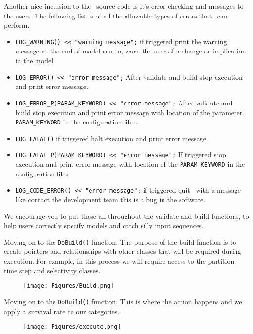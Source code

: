 Another nice inclusion to the \CNAME\ source code is it's error checking and messages to the users. The following list is of all the allowable types of errors that \CNAME\ can perform.

\begin{itemize}
	\item \texttt{LOG\_WARNING() << "warning message";} if triggered print the warning message at the end of model run to, warn the user of a change or implication in the model.
	\item \texttt{LOG\_ERROR() << "error message";} After validate and build stop execution and print error message.
	\item \texttt{LOG\_ERROR\_P(PARAM\_KEYWORD) << "error message";} After validate and build stop execution and print error message with location of the parameter \texttt{PARAM\_KEYWORD} in the configuration files.
	\item \texttt{LOG\_FATAL()} if triggered halt execution and print error message.
	\item \texttt{LOG\_FATAL\_P(PARAM\_KEYWORD) << "error message";} If triggered stop execution and print error message with location of the \texttt{PARAM\_KEYWORD} in the configuration files.		
	\item \texttt{LOG\_CODE\_ERROR() << "error message";} if triggered quit \CNAME\ with a message like contact the development team this is a bug in the software.	
\end{itemize}

We encourage you to put these all throughout the validate and build functions, to help users correctly specify models and catch silly input sequences.


Moving on to the \texttt{DoBuild()} function. The purpose of the build function is to create pointers and relationships with other classes that will be required during execution. For example, in this process we will require access to the partition, time step and selectivity classes.

\begin{figure}[!ht]
	\centering
	\texttt{[image: Figures/Build.png]}
	\caption{}\label{fig:build}
\end{figure}


Moving on to the \texttt{DoBuild()} function. This is where the action happens and we apply a survival rate to our categories.
\clearpage
\begin{figure}[!ht]
	\centering
	\texttt{[image: Figures/execute.png]}
	\caption{}\label{fig:execute}
\end{figure}


